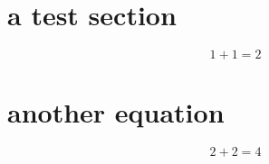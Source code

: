 \documentclass{article}
\begin{document}
    \section{a test section}
        \begin{equation}
            1+1=2
        \end{equation}
        
    \section{another equation}
        \begin{equation}
            2+2=4
        \end{equation}
    
\end{document}
